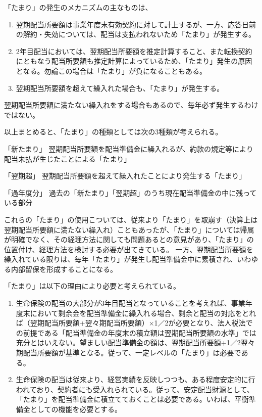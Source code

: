 \documentclass[report,gutter=10mm,fore-edge=10mm,uplatex,dvipdfmx]{jlreq}
\begin{document}
「たまり」の発生のメカニズムの主なものは、
\begin{enumerate} [1) ]
\item 翌期配当所要額は事業年度末有効契約に対して計上するが、一方、応答日前の解約・失効については、配当は支払われないため「たまり」が発生する。
\item 2年目配当においては、翌期配当所要額を推定計算すること、また転換契約にともなう配当所要額も推定計算によっているため、「たまり」発生の原因となる。勿論この場合は「たまり」が負になることもある。
\item 翌期配当所要額を超えて繰入れた場合も、「たまり」が発生する。
\end{enumerate}

翌期配当所要額に満たない繰入れをする場合もあるので、毎年必ず発生するわけではない。

以上まとめると、「たまり」の種類としては次の3種類が考えられる。

「新たまり」 翌期配当所要額を配当準備金に繰入れるが、約款の規定等により配当未払が生じたことによる「たまり」

「翌期超」 翌期配当所要額を超えて繰入れたことにより発生する「たまり」

「過年度分」 過去の「新たまり」「翌期超」のうち現在配当準備金の中に残っている部分

これらの「たまり」の使用こついては、従来より「たまり」を取崩す（決算上は翌期配当所要額に満たない繰入れ）こともあったが、「たまり」については帰属が明確でなく、その経理方法に関しても問題あるとの意見があり、「たまり」の位置付け、経理方法を検討する必要が出てきている。
一方、翌期配当所要額を繰入れている限りは、毎年「たまり」が発生し配当準備金中に累積され、いわゆる内部留保を形成することになる。

「たまり」は以下の理由により必要と考えられている。
\begin{enumerate}[ 1) ]
\item 生命保険の配当の大部分が3年目配当となっていることを考えれば、事業年度末において剰余金を配当準備金に繰入れる場合、剰余と配当の対応をとれば（翌期配当所要額+翌々期配当所要額）×1／2が必要となり、法人税法での前提である「配当準備金の年度末の積立額は翌期配当所要額の水準」では充分とはいえない。望ましい配当準備金の額は、翌期配当所要額+1／2翌々期配当所要額が基準となる。従って、一定レベルの「たまり」は必要である。
\item 生命保険の配当は従来より、経営実績を反映しつつも、ある程度安定的に行われており、契約者にも受入れられている。従って、安定配当財源として、「たまり」を配当準備金に積立てておくことは必要である。いわば、平衡準備金としての機能を必要とする。
\end{enumerate}
\end{document}
